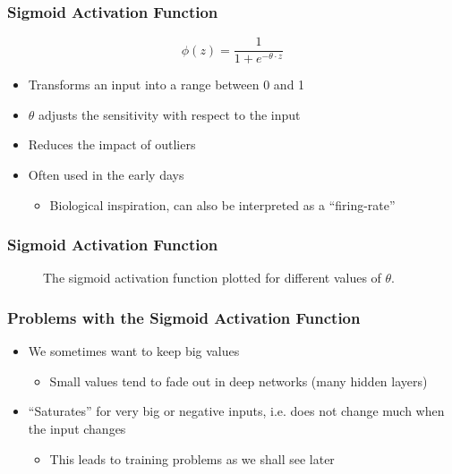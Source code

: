 \begin{frame}
  \frametitle{Sigmoid Activation Function}
  \begin{equation}
    \phi(z) = \frac{1}{1 + e^{-\theta \cdot z}}
  \end{equation}
  \begin{itemize}
    \item Transforms an input into a range between 0 and 1
    \item \(\theta\) adjusts the sensitivity with respect to the input
    \item Reduces the impact of outliers
    \item Often used in the early days
      \begin{itemize}
        \item Biological inspiration, can also be interpreted as a ``firing-rate''
      \end{itemize}
  \end{itemize}
\end{frame}

\begin{frame}
  \frametitle{Sigmoid Activation Function}
  \begin{figure}
    \resizebox{.6\textwidth}{!}{}
    \caption{The sigmoid activation function plotted for different
      values of \(\theta\).}
  \end{figure}
\end{frame}

\begin{frame}
  \frametitle{Problems with the Sigmoid Activation Function}
  \begin{itemize}
    \item We sometimes want to keep big values
      \begin{itemize}
        \item Small values tend to fade out in deep networks (many
          hidden layers)
      \end{itemize}
    \item ``Saturates'' for very big or negative inputs, i.e. does
      not change much when the input changes
      \begin{itemize}
        \item This leads to training problems as we shall see later
      \end{itemize}
  \end{itemize}
\end{frame}

